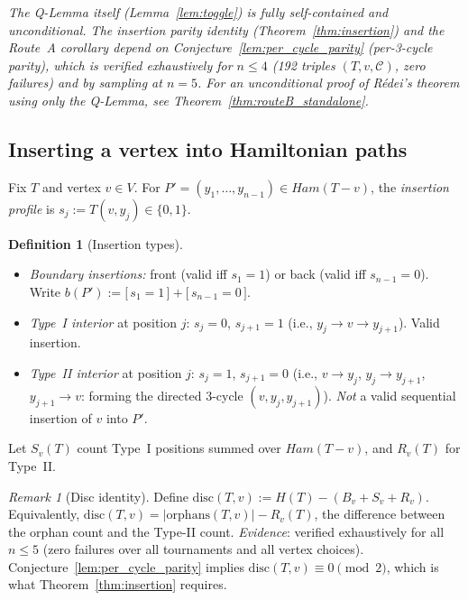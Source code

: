 \documentclass[12pt,reqno]{amsart}
\theoremstyle{plain}
\theoremstyle{definition}
\newtheorem{definition}[theorem]{Definition}
\theoremstyle{remark}
\newtheorem{remark}[theorem]{Remark}
\newcommand{\Ham}{\mathrm{Ham}}
\newcommand{\iverson}[1]{\bigl[\,#1\,\bigr]}
\renewcommand{\Ham}{Ham}%
\begin{document}
\noindent\textit{The Q-Lemma itself (Lemma~\ref{lem:toggle}) is fully self-contained and
unconditional. The insertion parity identity (Theorem~\ref{thm:insertion}) and the
Route~A corollary depend on Conjecture~\ref{lem:per_cycle_parity} (per-3-cycle parity),
which is verified exhaustively for $n \leq 4$ (192 triples $(T,v,\mathcal{C})$,
zero failures) and by sampling at $n=5$.
For an unconditional proof of Rédei's theorem using only the Q-Lemma, see
Theorem~\ref{thm:routeB_standalone}.}

\subsection{Inserting a vertex into Hamiltonian paths}

Fix $T$ and vertex $v\in V$. For $P'=(y_1,\ldots,y_{n-1})\in\Ham(T{-}v)$, the
\emph{insertion profile} is $s_j := T(v,y_j)\in\{0,1\}$.

\begin{definition}[Insertion types]\label{def:insertions}
\begin{itemize}[nosep]
  \item \emph{Boundary insertions:} front (valid iff $s_1=1$) or back (valid iff
    $s_{n-1}=0$). Write $b(P') := \iverson{s_1=1} + \iverson{s_{n-1}=0}$.
  \item \emph{Type~I interior} at position $j$: $s_j=0$, $s_{j+1}=1$
    (i.e., $y_j \to v \to y_{j+1}$). Valid insertion.
  \item \emph{Type~II interior} at position $j$: $s_j=1$, $s_{j+1}=0$
    (i.e., $v \to y_j$, $y_j \to y_{j+1}$, $y_{j+1} \to v$: forming the
    directed 3-cycle $(v, y_j, y_{j+1})$).
    \emph{Not} a valid sequential insertion of $v$ into $P'$.
\end{itemize}
Let $S_v(T)$ count Type~I positions summed over $\Ham(T{-}v)$, and $R_v(T)$
for Type~II.
\end{definition}

\begin{remark}[Disc identity]\label{rem:disc_identity}
Define $\mathrm{disc}(T,v) := H(T) - (B_v + S_v + R_v)$. Equivalently,
$\mathrm{disc}(T,v) = |\mathrm{orphans}(T,v)| - R_v(T)$,
the difference between the orphan count and the Type-II count.
\emph{Evidence}: verified exhaustively for all $n \leq 5$ (zero failures
over all tournaments and all vertex choices). Conjecture~\ref{lem:per_cycle_parity}
implies $\mathrm{disc}(T,v) \equiv 0 \pmod{2}$, which is what
Theorem~\ref{thm:insertion} requires.
\end{remark}
\end{document}
